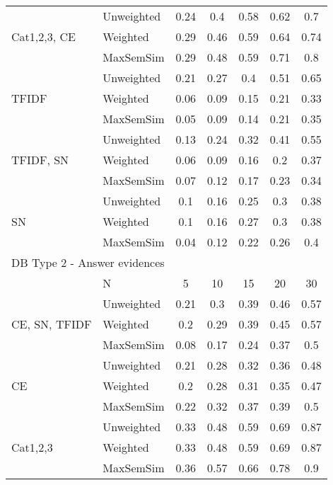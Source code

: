 \documentclass[conference]{IEEEtran}
\begin{document}
\begin{table*}[!h]
\begin{tabular}{l||l|ccccc}
		\multirow{3}{*}{Cat1,2,3, CE} & Unweighted & 0.24 & 0.4 & 0.58 & 0.62 & 0.7\\
		 & Weighted & 0.29 & 0.46 & 0.59 & 0.64 & 0.74\\
		 & MaxSemSim & 0.29 & 0.48 & 0.59 & 0.71 & 0.8\\ 
		\hline
		
		\multirow{3}{*}{TFIDF} & Unweighted & 0.21 & 0.27 & 0.4 & 0.51 & 0.65\\
		 & Weighted & 0.06 & 0.09 & 0.15 & 0.21 & 0.33\\
		 & MaxSemSim & 0.05 & 0.09 & 0.14 & 0.21 & 0.35\\ 
		\hline
		
		\multirow{3}{*}{TFIDF, SN} & Unweighted & 0.13 & 0.24 & 0.32 & 0.41 & 0.55\\
		 & Weighted & 0.06 & 0.09 & 0.16 & 0.2 & 0.37\\
		 & MaxSemSim & 0.07 & 0.12 & 0.17 & 0.23 & 0.34\\ 
		\hline
		
		\multirow{3}{*}{SN} & Unweighted & 0.1 & 0.16 & 0.25 & 0.3 & 0.38\\
		 & Weighted & 0.1 & 0.16 & 0.27 & 0.3 & 0.38\\
		 & MaxSemSim & 0.04 & 0.12 & 0.22 & 0.26 & 0.4\\ 
		\hline		

		\multicolumn{7}{l}{DB Type 2 - Answer evidences}\\\hline\hline
		& N & 5 & 10 & 15 & 20 & 30\\\hline
		\hline
		
		\multirow{3}{*}{CE, SN, TFIDF} & Unweighted & 0.21 & 0.3 & 0.39 & 0.46 & 0.57\\
		 & Weighted & 0.2 & 0.29 & 0.39 & 0.45 & 0.57\\
		 & MaxSemSim & 0.08 & 0.17 & 0.24 & 0.37 & 0.5\\ 
		\hline
		
		\multirow{3}{*}{CE} & Unweighted & 0.21 & 0.28 & 0.32 & 0.36 & 0.48\\
		 & Weighted & 0.2 & 0.28 & 0.31 & 0.35 & 0.47\\
		 & MaxSemSim & 0.22 & 0.32 & 0.37 & 0.39 & 0.5 \\ 
		\hline
		
		\multirow{3}{*}{Cat1,2,3} & Unweighted & 0.33 & 0.48 & 0.59 & 0.69 & 0.87\\
		 & Weighted & 0.33 & 0.48 & 0.59 & 0.69 & 0.87\\
		 & MaxSemSim & 0.36 & 0.57 & 0.66 & 0.78 & 0.9\\ 
		\hline
		

\end{tabular}
\end{table*}
\end{document}
